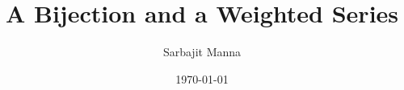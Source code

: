 \newcommand{\R}{\mathbb{R}}
\newcommand{\N}{\mathbb{N}}
\newcommand{\Z}{\mathbb{Z}}
\newcommand{\Q}{\mathbb{Q}}
\newcommand{\C}{\mathbb{C}}
\newcommand{\Prob}{\mathbb{P}}
\newcommand{\E}{\mathbb{E}}
\newcommand{\Leb}{\mathcal{L}}
\newcommand{\Borel}{\mathcal{B}}
\newcommand{\fiber}{F}
\newcommand{\confocal}{\Omega}

\DeclareMathOperator{\supp}{supp}
\DeclareMathOperator{\Var}{Var}
\DeclareMathOperator{\Cov}{Cov}
\DeclareMathOperator{\diam}{diam}
\DeclareMathOperator{\dist}{dist}
\DeclareMathOperator{\grad}{grad}
\DeclareMathOperator{\curl}{curl}
\DeclareMathOperator{\div}{div}
\DeclareMathOperator{\tr}{tr}  %

\title{\textbf{A Bijection and a Weighted Series}}
\author{
    Sarbajit Manna
}
\date{\today}